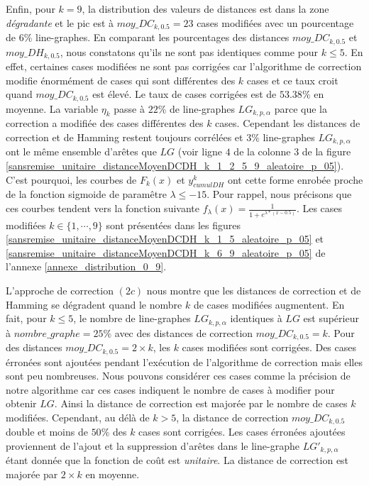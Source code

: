Enfin, pour $k=9$, la distribution des valeurs de distances est dans la zone {\em d\'egradante} et le pic est \`a $moy\_DC_{k,0.5} = 23$ cases modifi\'ees avec un pourcentage de $6\%$ line-graphes.  
En comparant les pourcentages des distances $moy\_DC_{k,0.5}$ et $moy\_DH_{k,0.5}$, nous constatons qu'ils ne sont pas identiques comme pour $k \le 5$. En effet, certaines cases modifi\'ees ne sont pas corrig\'ees car l'algorithme de correction modifie \'enorm\'ement de cases qui sont diff\'erentes des $k$ cases et ce taux croit quand  $moy\_DC_{k,0.5}$ est \'elev\'e. 
Le taux de cases corrig\'ees est de $53.38\%$ en moyenne.
La variable $\eta_k$ passe \`a $22\%$ de line-graphes $LG_{k,p,\alpha}$ parce que la correction a modifi\'ee des cases diff\'erentes des $k$ cases. Cependant les distances de correction et de Hamming restent toujours corr\'el\'ees et $3\%$ line-graphes $LG_{k,p,\alpha}$ ont le m\^eme ensemble d'ar\^etes que $LG$ (voir ligne $4$ de la colonne $3$ de la figure \ref{sansremise_unitaire_distanceMoyenDCDH_k_1_2_5_9_aleatoire_p_05}).
C'est pourquoi, les courbes de  $F_k(x)$ et $y_{cumulDH}^{k}$ ont cette forme enrob\'ee proche de la fonction  sigmoide de param\^etre $\lambda \le -15$. Pour rappel, nous pr\'ecisons que ces courbes  tendent vers la fonction suivante $f_{\lambda}(x) = \frac{1}{1+e^{\lambda * (x-0.5)}}$.
\newline
Les  cases modifi\'ees $k \in \{1,\cdots,9\}$ sont pr\'esent\'ees dans les figures 
 \ref{sansremise_unitaire_distanceMoyenDCDH_k_1_5_aleatoire_p_05} et  
\ref{sansremise_unitaire_distanceMoyenDCDH_k_6_9_aleatoire_p_05} de l'annexe \ref{annexe_distribution_0_9}.
\newline

L'approche de correction $(2c)$ nous montre que les distances de correction et de Hamming se d\'egradent quand le nombre $k$ de cases modifi\'ees augmentent. En fait, pour $k \le 5$, le nombre de line-graphes $LG_{k,p,\alpha}$ identiques \`a $LG$ est sup\'erieur \`a $nombre\_graphe = 25\%$ avec des distances de correction $moy\_DC_{k,0.5} = k$. Pour des distances $moy\_DC_{k,0.5} = 2 \times k$, les  $k$ cases modifi\'ees sont corrig\'ees. 
Des cases \'erron\'ees sont ajout\'ees pendant l'ex\'ecution de l'algorithme de correction mais elles sont peu nombreuses. Nous pouvons consid\'erer ces cases comme la pr\'ecision de notre algorithme  car ces cases indiquent le nombre de cases \`a modifier pour obtenir $LG$. Ainsi la distance de correction est major\'ee par le nombre de cases $k$ modifi\'ees.
Cependant, au d\'el\`a de $k > 5$,  la distance de correction $moy\_DC_{k,0.5}$ double et moins de $50\%$ des $k$ cases sont corrig\'ees. Les cases \'erron\'ees ajout\'ees proviennent de l'ajout et la suppression d'ar\^etes dans le line-graphe $LG'_{k,p,\alpha}$ \'etant donn\'ee que la fonction de co\^ut est {\em unitaire}. La distance de correction est major\'ee par $2 \times k$ en moyenne.
\newline

